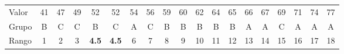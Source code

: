 \documentclass[12pt,a4paper]{article}
\begin{document}
\vspace{34pt}
\begin{center}
{\fontsize{13.6}{17}\selectfont
\renewcommand{\arraystretch}{1.25}
\setlength{\tabcolsep}{6.4pt}
\begin{tabular}{l c c c c c c c c c c c c c c c c c c}
\toprule
Valor & 41 & 47 & 49 & 52 & 52 & 54 & 56 & 59 & 60 & 62 & 64 & 65 & 66 & 67 & 69 & 71 & 74 & 77 \\
Grupo & B & C & C & B & C & A & C & B & B & B & B & B & A & A & C & A & A & A \\
\midrule
Rango & 1 & 2 & 3 & \textbf{4.5} & \textbf{4.5} & 6 & 7 & 8 & 9 & 10 & 11 & 12 & 13 & 14 & 15 & 16 & 17 & 18 \\
\bottomrule
\end{tabular}
}
\end{center}
\end{document}
